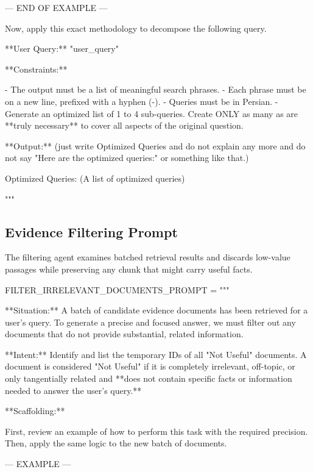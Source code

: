 \documentclass[11pt]{article}
\begin{document}
\begin{PromptBlock}

--- END OF EXAMPLE ---

Now, apply this exact methodology to decompose the following query.

**User Query:** "{user_query}"

**Constraints:**

- The output must be a list of meaningful search phrases.
- Each phrase must be on a new line, prefixed with a hyphen (-).
- Queries must be in Persian.
- Generate an optimized list of 1 to 4 sub-queries. Create ONLY as many as are **truly necessary** to cover all aspects of the original question.

**Output:** (just write Optimized Queries and do not explain any more and do not say "Here are the optimized queries:" or something like that.)

Optimized Queries: (A list of optimized queries)

"""
\end{PromptBlock}

\subsection{Evidence Filtering Prompt}

The filtering agent examines batched retrieval results and discards low-value passages while preserving any chunk that might carry useful facts.

\begin{PromptBlock}
FILTER_IRRELEVANT_DOCUMENTS_PROMPT = """

**Situation:** A batch of candidate evidence documents has been retrieved for a user's query. To generate a precise and focused answer, we must filter out any documents that do not provide substantial, related information.

**Intent:** Identify and list the temporary IDs of all "Not Useful" documents. A document is considered "Not Useful" if it is completely irrelevant, off-topic, or only tangentially related and **does not contain specific facts or information needed to answer the user's query.**

**Scaffolding:**

First, review an example of how to perform this task with the required precision. Then, apply the same logic to the new batch of documents.

--- EXAMPLE ---
\end{PromptBlock}
\end{document}
